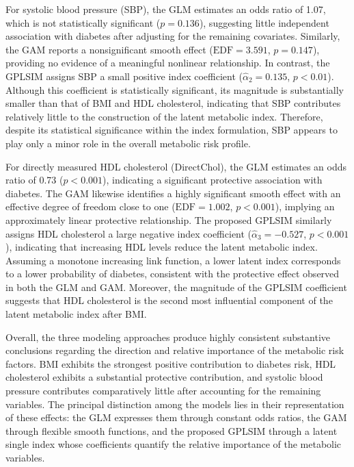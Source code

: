 For systolic blood pressure (SBP), the GLM estimates an odds ratio of 1.07, which is not statistically significant ($p=0.136$), suggesting little independent association with diabetes after adjusting for the remaining covariates. Similarly, the GAM reports a nonsignificant smooth effect ($\mathrm{EDF}=3.591$, $p=0.147$), providing no evidence of a meaningful nonlinear relationship. In contrast, the GPLSIM assigns SBP a small positive index coefficient ($\hat{\alpha}_2=0.135$, $p<0.01$). Although this coefficient is statistically significant, its magnitude is substantially smaller than that of BMI and HDL cholesterol, indicating that SBP contributes relatively little to the construction of the latent metabolic index. Therefore, despite its statistical significance within the index formulation, SBP appears to play only a minor role in the overall metabolic risk profile.

For directly measured HDL cholesterol (DirectChol), the GLM estimates an odds ratio of 0.73 ($p<0.001$), indicating a significant protective association with diabetes. The GAM likewise identifies a highly significant smooth effect with an effective degree of freedom close to one ($\mathrm{EDF}=1.002$, $p<0.001$), implying an approximately linear protective relationship. The proposed GPLSIM similarly assigns HDL cholesterol a large negative index coefficient ($\hat{\alpha}_3=-0.527$, $p<0.001$), indicating that increasing HDL levels reduce the latent metabolic index. Assuming a monotone increasing link function, a lower latent index corresponds to a lower probability of diabetes, consistent with the protective effect observed in both the GLM and GAM. Moreover, the magnitude of the GPLSIM coefficient suggests that HDL cholesterol is the second most influential component of the latent metabolic index after BMI.

Overall, the three modeling approaches produce highly consistent substantive conclusions regarding the direction and relative importance of the metabolic risk factors. BMI exhibits the strongest positive contribution to diabetes risk, HDL cholesterol exhibits a substantial protective contribution, and systolic blood pressure contributes comparatively little after accounting for the remaining variables. The principal distinction among the models lies in their representation of these effects: the GLM expresses them through constant odds ratios, the GAM through flexible smooth functions, and the proposed GPLSIM through a latent single index whose coefficients quantify the relative importance of the metabolic variables.

